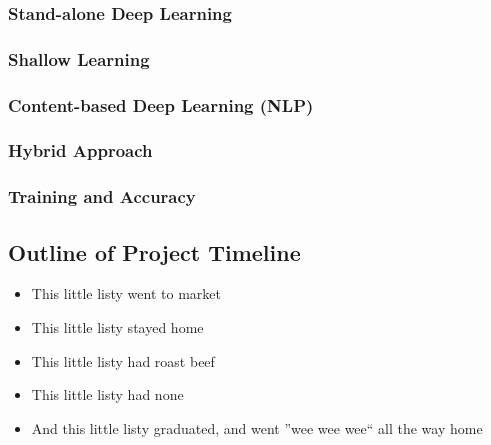 \documentclass[letterpaper,12pt]{article}
\begin{document}
\subsubsection{Stand-alone Deep Learning}

\subsubsection{Shallow Learning} %

\subsubsection{Content-based Deep Learning (NLP)}

\subsubsection{Hybrid Approach}

\subsubsection{Training and Accuracy}

\subsection{Outline of Project Timeline}
\begin{itemize}
	\item This little listy went to market
	\item This little listy stayed home
	\item This little listy had roast beef
	\item This little listy had none
	\item And this little listy graduated, and went ''wee wee wee`` all the way home
\end{itemize}

\end{document}
